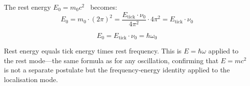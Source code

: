 \documentclass[twocolumn,10pt,a4paper]{article}
\theoremstyle{definition}
\theoremstyle{remark}
\begin{document}
The rest energy $E_0 = m_0 c^2$~\cite{sachikonye2025ion} becomes:
\begin{equation}
E_0 = m_0 \cdot (2\pi)^2 = \frac{E_{\text{tick}} \cdot \nu_0}{4\pi^2} \cdot 4\pi^2 = E_{\text{tick}} \cdot \nu_0
\label{eq:E_mc2_angular}
\end{equation}

\begin{equation}
\boxed{E_0 = E_{\text{tick}} \cdot \nu_0 = \hbar\omega_0}
\label{eq:E0_clean}
\end{equation}

Rest energy equals tick energy times rest frequency. This is $E = \hbar\omega$ applied to the rest mode---the same formula as for any oscillation, confirming that $E = mc^2$ is not a separate postulate but the frequency-energy identity applied to the localisation mode.
\end{document}
